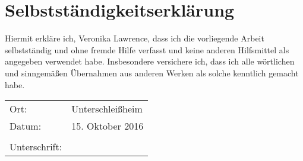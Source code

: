 \section*{Selbstst\"andigkeitserkl\"arung}

Hiermit erkl\"are ich, Veronika Lawrence, dass ich die vorliegende Arbeit selbstst\"andig und ohne fremde Hilfe 
verfasst und keine anderen Hilfsmittel als angegeben verwendet habe. Insbesondere versichere ich, dass ich alle w\"ortlichen und sinngem\"aßen \"Ubernahmen aus anderen Werken 
als solche kenntlich gemacht habe. 

\vspace{3mm}
\begin{table}[htb]
	\begin{tabular}{p{3cm} l}
		\rule{0pt}{3ex}Ort: & Unterschlei\ss{}heim\\
		\rule{0pt}{3ex}Datum: &15. Oktober 2016\\%
		&\\
		\rule{0pt}{3ex}Unterschrift:&\\
	\end{tabular}
	\vspace{3mm}

\end{table}
